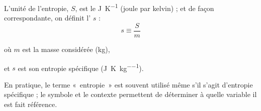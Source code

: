 		L’unité de l’entropie, $S$, est le \si{\joule\per\kelvin} (\si{joule} par \si{kelvin}) ; et de façon correspondante, on définit l’ $s$ :
		\begin{equation}
			s \equiv  \frac{S}{m}
		\end{equation}
		\begin{equationterms}
			\item où \tab $m$ \tab est la masse considérée (\si{\kilogram}),
			\item et \tab $s$ \tab est son entropie spécifique (\si{\joule\per\kelvin\per\kilogram}).
		\end{equationterms}

		En pratique, le terme «~entropie~» est souvent utilisé même s’il s’agit d’entropie spécifique ; le symbole et le contexte permettent de déterminer à quelle variable il est fait référence.

